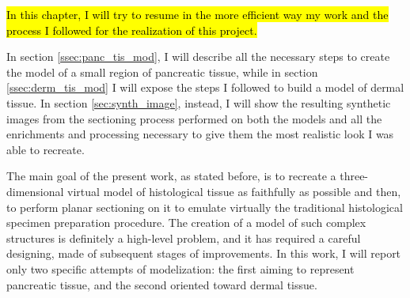 \hl{In this chapter, I will try to resume in the more efficient way my work and the process I followed for the realization of this project.}

In section \ref{ssec:panc_tis_mod}, I will describe all the necessary steps to create the model of a small region of pancreatic tissue, while in section \ref{ssec:derm_tis_mod} I will expose the steps I followed to build a model of dermal tissue. In section \ref{sec:synth_image}, instead, I will show the resulting synthetic images from the sectioning process performed on both the models and all the enrichments and processing necessary to give them the most realistic look I was able to recreate.


The main goal of the present work, as stated before, is to recreate a three-dimensional virtual model of histological tissue as faithfully as possible and then, to perform planar sectioning on it to emulate virtually the traditional histological specimen preparation procedure. The creation of a model of such complex structures is definitely a high-level problem, and it has required a careful designing, made of subsequent stages of improvements. In this work, I will report only two specific attempts of modelization: the first aiming to represent pancreatic tissue, and the second oriented toward dermal tissue.
